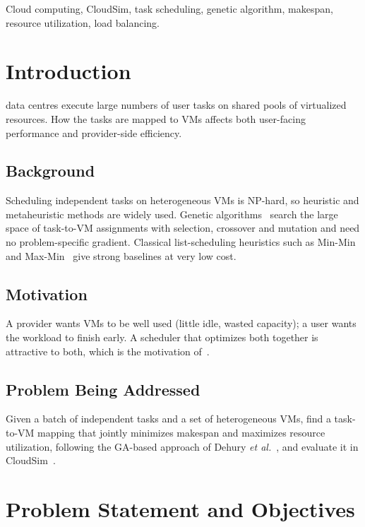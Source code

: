 \documentclass[journal,onecolumn,12pt]{IEEEtran}
\begin{document}
\begin{IEEEkeywords}
Cloud computing, CloudSim, task scheduling, genetic algorithm, makespan, resource utilization, load balancing.
\end{IEEEkeywords}

\section{Introduction}

 data centres execute large numbers of user tasks on shared pools of virtualized resources. How the tasks are mapped to VMs affects both user-facing performance and provider-side efficiency.

\subsection{Background}
Scheduling independent tasks on heterogeneous VMs is NP-hard, so heuristic and metaheuristic methods are widely used. Genetic algorithms~\cite{holland} search the large space of task-to-VM assignments with selection, crossover and mutation and need no problem-specific gradient. Classical list-scheduling heuristics such as Min-Min and Max-Min~\cite{ibarra,braun} give strong baselines at very low cost.

\subsection{Motivation}
A provider wants VMs to be well used (little idle, wasted capacity); a user wants the workload to finish early. A scheduler that optimizes both together is attractive to both, which is the motivation of~\cite{dehury}.

\subsection{Problem Being Addressed}
Given a batch of independent tasks and a set of heterogeneous VMs, find a task-to-VM mapping that jointly minimizes makespan and maximizes resource utilization, following the GA-based approach of Dehury \textit{et al.}~\cite{dehury}, and evaluate it in CloudSim~\cite{cloudsim}.

\section{Problem Statement and Objectives}
\end{document}

